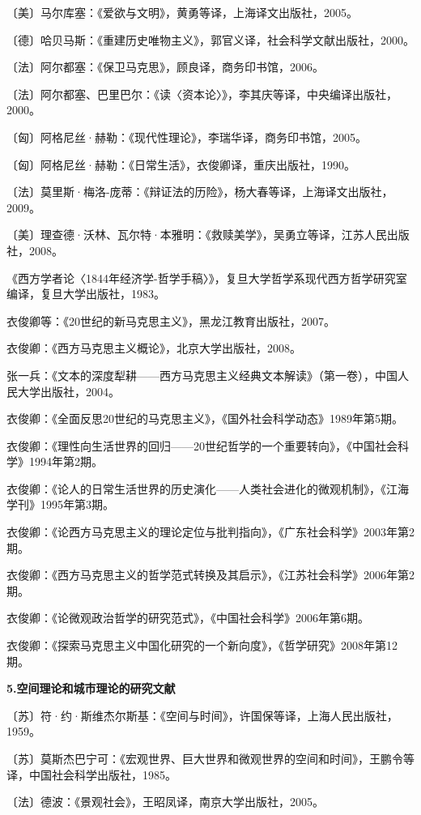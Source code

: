 \documentclass[UTF8, fontset = sourcesans, a4paper, oneside, zihao =
-4, scheme=chinese, no-math, space=true]{ctexbook}
\begin{document}
〔美〕马尔库塞：《爱欲与文明》，黄勇等译，上海译文出版社，2005。

〔德〕哈贝马斯：《重建历史唯物主义》，郭官义译，社会科学文献出版社，2000。

〔法〕阿尔都塞：《保卫马克思》，顾良译，商务印书馆，2006。

〔法〕阿尔都塞、巴里巴尔：《读〈资本论〉》，李其庆等译，中央编译出版社，2000。

〔匈〕阿格尼丝·赫勒：《现代性理论》，李瑞华译，商务印书馆，2005。

〔匈〕阿格尼丝·赫勒：《日常生活》，衣俊卿译，重庆出版社，1990。

〔法〕莫里斯·梅洛-庞蒂：《辩证法的历险》，杨大春等译，上海译文出版社，2009。

〔美〕理查德·沃林、瓦尔特·本雅明：《救赎美学》，吴勇立等译，江苏人民出版社，2008。

《西方学者论〈1844年经济学-哲学手稿〉》，复旦大学哲学系现代西方哲学研究室编译，复旦大学出版社，1983。

衣俊卿等：《20世纪的新马克思主义》，黑龙江教育出版社，2007。

衣俊卿：《西方马克思主义概论》，北京大学出版社，2008。

张一兵：《文本的深度犁耕------西方马克思主义经典文本解读》（第一卷），中国人民大学出版社，2004。

衣俊卿：《全面反思20世纪的马克思主义》，《国外社会科学动态》1989年第5期。

衣俊卿：《理性向生活世界的回归------20世纪哲学的一个重要转向》，《中国社会科学》1994年第2期。

衣俊卿：《论人的日常生活世界的历史演化------人类社会进化的微观机制》，《江海学刊》1995年第3期。

衣俊卿：《论西方马克思主义的理论定位与批判指向》，《广东社会科学》2003年第2期。

衣俊卿：《西方马克思主义的哲学范式转换及其启示》，《江苏社会科学》2006年第2期。

衣俊卿：《论微观政治哲学的研究范式》，《中国社会科学》2006年第6期。

衣俊卿：《探索马克思主义中国化研究的一个新向度》，《哲学研究》2008年第12期。

\textbf{5.空间理论和城市理论的研究文献}

〔苏〕符·约·斯维杰尔斯基：《空间与时间》，许国保等译，上海人民出版社，1959。

〔苏〕莫斯杰巴宁可：《宏观世界、巨大世界和微观世界的空间和时间》，王鹏令等译，中国社会科学出版社，1985。

〔法〕德波：《景观社会》，王昭凤译，南京大学出版社，2005。
\end{document}
